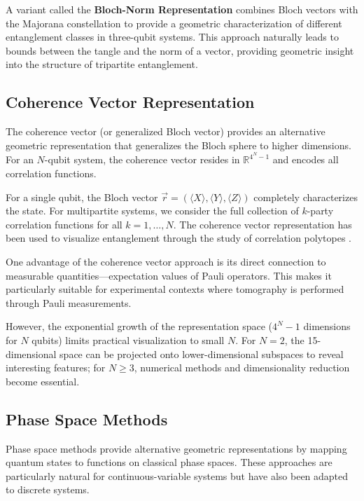 \documentclass[12pt,a4paper]{article}
\begin{document}
A variant called the \textbf{Bloch-Norm Representation} \cite{Benedito2025} combines Bloch vectors with the Majorana constellation to provide a geometric characterization of different entanglement classes in three-qubit systems. This approach naturally leads to bounds between the tangle and the norm of a vector, providing geometric insight into the structure of tripartite entanglement.

\subsection{Coherence Vector Representation}
\label{sec:coherence}

The coherence vector (or generalized Bloch vector) provides an alternative geometric representation that generalizes the Bloch sphere to higher dimensions. For an $N$-qubit system, the coherence vector resides in $\mathbb{R}^{4^N - 1}$ and encodes all correlation functions.

For a single qubit, the Bloch vector $\vec{r} = (\langle X \rangle, \langle Y \rangle, \langle Z \rangle)$ completely characterizes the state. For multipartite systems, we consider the full collection of $k$-party correlation functions for all $k = 1, \ldots, N$. The coherence vector representation has been used to visualize entanglement through the study of correlation polytopes \cite{EntangledGraphs}.

One advantage of the coherence vector approach is its direct connection to measurable quantities---expectation values of Pauli operators. This makes it particularly suitable for experimental contexts where tomography is performed through Pauli measurements.

However, the exponential growth of the representation space ($4^N - 1$ dimensions for $N$ qubits) limits practical visualization to small $N$. For $N = 2$, the 15-dimensional space can be projected onto lower-dimensional subspaces to reveal interesting features; for $N \geq 3$, numerical methods and dimensionality reduction become essential.

\subsection{Phase Space Methods}
\label{sec:phase-space}

Phase space methods provide alternative geometric representations by mapping quantum states to functions on classical phase spaces. These approaches are particularly natural for continuous-variable systems but have also been adapted to discrete systems.
\end{document}
